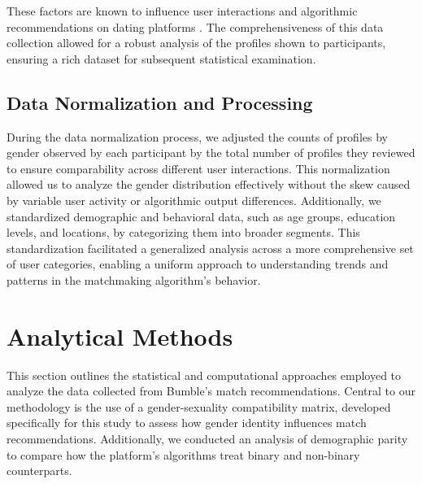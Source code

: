 These factors are known to influence user interactions and algorithmic recommendations on dating platforms \cite{Tyson_Perta_Haddadi_Seto_2016}. The comprehensiveness of this data collection allowed for a robust analysis of the profiles shown to participants, ensuring a rich dataset for subsequent statistical examination.

\subsection{Data Normalization and Processing}
During the data normalization process, we adjusted the counts of profiles by gender observed by each participant by the total number of profiles they reviewed to ensure comparability across different user interactions. This normalization allowed us to analyze the gender distribution effectively without the skew caused by variable user activity or algorithmic output differences. Additionally, we standardized demographic and behavioral data, such as age groups, education levels, and locations, by categorizing them into broader segments. This standardization facilitated a generalized analysis across a more comprehensive set of user categories, enabling a uniform approach to understanding trends and patterns in the matchmaking algorithm’s behavior.


\section{Analytical Methods}
This section outlines the statistical and computational approaches employed to analyze the data collected from Bumble’s match recommendations. Central to our methodology is the use of a gender-sexuality compatibility matrix, developed specifically for this study to assess how gender identity influences match recommendations. Additionally, we conducted an analysis of demographic parity to compare how the platform's algorithms treat binary and non-binary counterparts.


